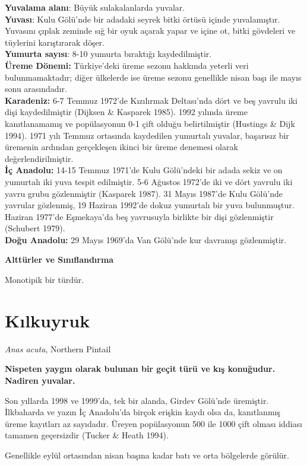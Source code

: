 \documentclass[
  letterpaper,
  DIV=11,
  numbers=noendperiod]{scrreprt}
\begin{document}
\textbf{Yuvalama alanı}: Büyük sulakalanlarda yuvalar.\\
\textbf{Yuvası}: Kulu Gölü'nde bir adadaki seyrek bitki örtüsü içinde
yuvalamıştır. Yuvasını çıplak zeminde sığ bir oyuk açarak yapar ve içine
ot, bitki gövdeleri ve tüylerini karıştırarak döşer.\\
\textbf{Yumurta sayısı}: 8-10 yumurta bıraktığı kaydedilmiştir.\\
\textbf{Üreme Dönemi:} Türkiye'deki üreme sezonu hakkında yeterli veri
bulunmamaktadır; diğer ülkelerde ise üreme sezonu genellikle nisan başı
ile mayıs sonu arasındadır.\\
\textbf{Karadeniz:} 6-7 Temmuz 1972'de Kızılırmak Deltası'nda dört ve
beş yavrulu iki dişi kaydedilmiştir (Dijksen \& Kasparek 1985). 1992
yılında üreme kanıtlanamamış ve popülasyonun 0-1 çift olduğu
belirtilmiştir (Hustings \& Dijk 1994). 1971 yılı Temmuz ortasında
kaydedilen yumurtalı yuvalar, başarısız bir üremenin ardından
gerçekleşen ikinci bir üreme denemesi olarak değerlendirilmiştir.\\
\textbf{İç Anadolu:} 14-15 Temmuz 1971'de Kulu Gölü'ndeki bir adada
sekiz ve on yumurtalı iki yuva tespit edilmiştir. 5-6 Ağustos 1972'de
iki ve dört yavrulu iki yavru grubu gözlenmiştir (Kasparek 1987). 31
Mayıs 1987'de Kulu Gölü'nde yavrular gözlenmiş, 19 Haziran 1992'de dokuz
yumurtalı bir yuva bulunmuştur. Haziran 1977'de Eşmekaya'da beş
yavrusuyla birlikte bir dişi gözlenmiştir (Schubert 1979).\\
\textbf{Doğu Anadolu:} 29 Mayıs 1969'da Van Gölü'nde kur davranışı
gözlenmiştir.

\textbf{Alttürler ve Sınıflandırma}

Monotipik bir türdür.

\section{Kılkuyruk}\label{kux131lkuyruk}

\emph{Anas acuta}, Northern Pintail

\textbf{Nispeten yaygın olarak bulunan bir geçit türü ve kış konuğudur.
Nadiren yuvalar.}

Son yıllarda 1998 ve 1999'da, tek bir alanda, Girdev Gölü'nde üremiştir.
İlkbaharda ve yazın İç Anadolu'da birçok erişkin kaydı olsa da,
kanıtlanmış üreme kayıtları az sayıdadır. Üreyen popülasyonun 500 ile
1000 çift olması iddiası tamamen geçersizdir (Tucker \& Heath 1994).

Genellikle eylül ortasından nisan başına kadar batı ve orta bölgelerde
görülür.
\end{document}
